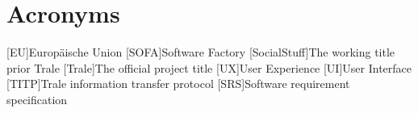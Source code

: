 \chapter{Acronyms}\label{ch:acronyms}
\begin{acronym}
    [EU]{Europäische Union}
    [SOFA]{Software Factory}
    [SocialStuff]{The working title prior Trale}
    [Trale]{The official project title}
    [UX]{User Experience}
    [UI]{User Interface}
    [TITP]{Trale information transfer protocol}
    [SRS]{Software requirement specification}
\end{acronym}
